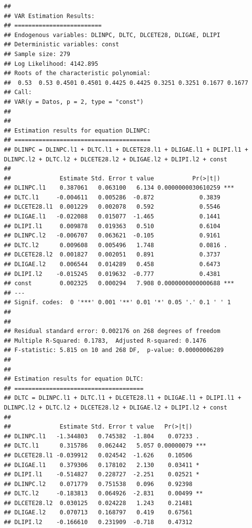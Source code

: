 \documentclass[
]{book}
\begin{document}
\begin{verbatim}
## 
## VAR Estimation Results:
## ========================= 
## Endogenous variables: DLINPC, DLTC, DLCETE28, DLIGAE, DLIPI 
## Deterministic variables: const 
## Sample size: 279 
## Log Likelihood: 4142.895 
## Roots of the characteristic polynomial:
##  0.53  0.53 0.4501 0.4501 0.4425 0.4425 0.3251 0.3251 0.1677 0.1677
## Call:
## VAR(y = Datos, p = 2, type = "const")
## 
## 
## Estimation results for equation DLINPC: 
## ======================================= 
## DLINPC = DLINPC.l1 + DLTC.l1 + DLCETE28.l1 + DLIGAE.l1 + DLIPI.l1 + DLINPC.l2 + DLTC.l2 + DLCETE28.l2 + DLIGAE.l2 + DLIPI.l2 + const 
## 
##              Estimate Std. Error t value           Pr(>|t|)    
## DLINPC.l1    0.387061   0.063100   6.134 0.0000000030610259 ***
## DLTC.l1     -0.004611   0.005286  -0.872             0.3839    
## DLCETE28.l1  0.001229   0.002078   0.592             0.5546    
## DLIGAE.l1   -0.022088   0.015077  -1.465             0.1441    
## DLIPI.l1     0.009878   0.019363   0.510             0.6104    
## DLINPC.l2   -0.006707   0.063621  -0.105             0.9161    
## DLTC.l2      0.009608   0.005496   1.748             0.0816 .  
## DLCETE28.l2  0.001827   0.002051   0.891             0.3737    
## DLIGAE.l2    0.006544   0.014289   0.458             0.6473    
## DLIPI.l2    -0.015245   0.019632  -0.777             0.4381    
## const        0.002325   0.000294   7.908 0.0000000000000688 ***
## ---
## Signif. codes:  0 '***' 0.001 '**' 0.01 '*' 0.05 '.' 0.1 ' ' 1
## 
## 
## Residual standard error: 0.002176 on 268 degrees of freedom
## Multiple R-Squared: 0.1783,  Adjusted R-squared: 0.1476 
## F-statistic: 5.815 on 10 and 268 DF,  p-value: 0.00000006289 
## 
## 
## Estimation results for equation DLTC: 
## ===================================== 
## DLTC = DLINPC.l1 + DLTC.l1 + DLCETE28.l1 + DLIGAE.l1 + DLIPI.l1 + DLINPC.l2 + DLTC.l2 + DLCETE28.l2 + DLIGAE.l2 + DLIPI.l2 + const 
## 
##              Estimate Std. Error t value   Pr(>|t|)    
## DLINPC.l1   -1.344803   0.745382  -1.804    0.07233 .  
## DLTC.l1      0.315786   0.062442   5.057 0.00000079 ***
## DLCETE28.l1 -0.039912   0.024542  -1.626    0.10506    
## DLIGAE.l1    0.379306   0.178102   2.130    0.03411 *  
## DLIPI.l1    -0.514827   0.228727  -2.251    0.02521 *  
## DLINPC.l2    0.071779   0.751538   0.096    0.92398    
## DLTC.l2     -0.183813   0.064926  -2.831    0.00499 ** 
## DLCETE28.l2  0.030125   0.024228   1.243    0.21481    
## DLIGAE.l2    0.070713   0.168797   0.419    0.67561    
## DLIPI.l2    -0.166610   0.231909  -0.718    0.47312    

\end{verbatim}
\end{document}
